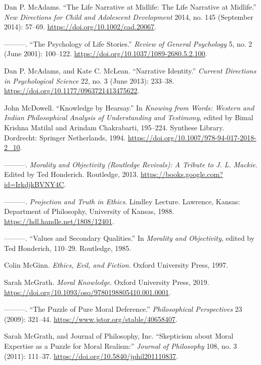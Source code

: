 \documentclass[phdthesis,12pt,final,a4paper]{wuthesis}
\newlength{\cslhangindent}
\newenvironment{CSLReferences}[2] %
{\begin{list}{}{%
	\setlength{\itemindent}{0pt}
	\setlength{\leftmargin}{0pt}
	\setlength{\parsep}{0pt}
	\ifodd #1
	\setlength{\leftmargin}{\cslhangindent}
	\setlength{\itemindent}{-1\cslhangindent}
	\fi
	\setlength{\itemsep}{#2\baselineskip}}}
{\end{list}}
\theoremstyle{definition}
\theoremstyle{definition}
\theoremstyle{definition}
\theoremstyle{definition}
\theoremstyle{remark}
\begin{document}
\begin{CSLReferences}{1}{0}
Dan P. McAdams. {``The {Life Narrative} at {Midlife}: {The Life Narrative} at {Midlife}.''} \emph{New Directions for Child and Adolescent Development} 2014, no. 145 (September 2014): 57--69. \url{https://doi.org/10.1002/cad.20067}.

---------. {``The {Psychology} of {Life Stories}.''} \emph{Review of General Psychology} 5, no. 2 (June 2001): 100--122. \url{https://doi.org/10.1037/1089-2680.5.2.100}.

Dan P. McAdams, and Kate C. McLean. {``Narrative {Identity}.''} \emph{Current Directions in Psychological Science} 22, no. 3 (June 2013): 233--38. \url{https://doi.org/10.1177/0963721413475622}.

John McDowell. {``Knowledge by {Hearsay}.''} In \emph{Knowing from {Words}: {Western} and {Indian Philosophical Analysis} of {Understanding} and {Testimony}}, edited by Bimal Krishna Matilal and Arindam Chakrabarti, 195--224. Synthese {Library}. Dordrecht: Springer Netherlands, 1994. \url{https://doi.org/10.1007/978-94-017-2018-2_10}.

---------. \emph{Morality and {Objectivity} ({Routledge Revivals}): {A Tribute} to {J}. {L}. {Mackie}}. Edited by Ted Honderich. Routledge, 2013. \url{https://books.google.com?id=IrkdjkBVNY4C}.

---------. \emph{Projection and {Truth} in {Ethics}}. Lindley Lecture. Lawrence, Kansas: Department of Philosophy, University of Kansas, 1988. \url{https://hdl.handle.net/1808/12401}.

---------. {``Values and {Secondary Qualities}.''} In \emph{Morality and {Objectivity}}, edited by Ted Honderich, 110--29. Routledge, 1985.

Colin McGinn. \emph{Ethics, {Evil}, and {Fiction}}. Oxford University Press, 1997.

Sarah McGrath. \emph{Moral {Knowledge}}. Oxford University Press, 2019. \url{https://doi.org/10.1093/oso/9780198805410.001.0001}.

---------. {``The {Puzzle} of {Pure Moral Deference}.''} \emph{Philosophical Perspectives} 23 (2009): 321--44. \url{https://www.jstor.org/stable/40658407}.

Sarah McGrath, and Journal of Philosophy, Inc. {``Skepticism about {Moral Expertise} as a {Puzzle} for {Moral Realism}:''} \emph{Journal of Philosophy} 108, no. 3 (2011): 111--37. \url{https://doi.org/10.5840/jphil201110837}.


\end{CSLReferences}
\end{document}
